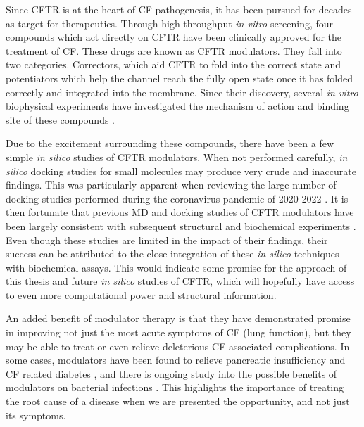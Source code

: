Since CFTR is at the heart of CF pathogenesis, it has been pursued for decades as target for therapeutics. Through high throughput \textit{in vitro} screening, four compounds which act directly on CFTR have been clinically approved for the treatment of CF. These drugs are known as CFTR modulators. They fall into two categories. Correctors, which aid CFTR to fold into the correct state and potentiators which help the channel reach the fully open state once it has folded correctly and integrated into the membrane. Since their discovery, several \textit {in vitro} biophysical experiments have investigated the mechanism of action and binding site of these compounds \cite{csanady2019,  laselva2022, yeh2017, yeh2019, fiedorczuk2022, krainer2018}. 

Due to the excitement surrounding these compounds, there have been a few simple \textit{in silico} studies of CFTR modulators\cite{molinski2018, bitam2021, baatallah2021, froux2020}. When not performed carefully, \textit{in silico} docking studies for small molecules may produce very crude and inaccurate findings. This was particularly apparent when reviewing the large number of docking studies performed during the coronavirus pandemic of 2020-2022 \cite{gimeno2019, derek_lowe_virtual_screening_2022, ceron-carrasco2022}. It is then fortunate that previous MD and docking studies of CFTR modulators have been largely consistent with subsequent structural and biochemical experiments \cite{liu2019, scientifique2019, yeh2019, yeh2017, fiedorczuk2022}. Even though these studies are limited in the impact of their findings, their success can be attributed to the close integration of these \textit{in silico} techniques with biochemical assays. This would indicate some promise for the approach of this thesis and future \textit{in silico} studies of CFTR, which will hopefully have access to even more computational power and structural information. 


An added benefit of modulator therapy is that they have demonstrated promise in improving not just the most acute symptoms of CF (lung function), but they may be able to treat or even relieve deleterious CF associated complications. In some cases, modulators have been found to relieve pancreatic insufficiency and CF related diabetes \cite{gaines2021,lopes-pacheco2020, yi2021}, and there is ongoing study into the possible benefits of modulators on bacterial infections \cite{harvey2022}. This highlights the importance of treating the root cause of a disease when we are presented the opportunity, and not just its symptoms. 

